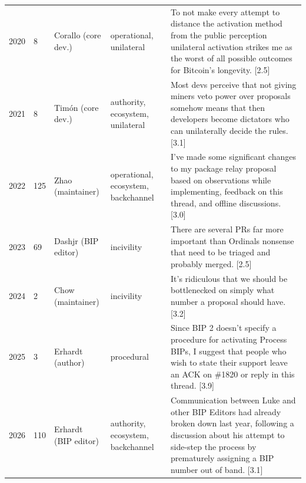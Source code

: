 \begin{table}[t]
\begin{tabular}{p{}p{}p{}p{}p{}}
2020 & 8 & Corallo (core dev.) & operational, unilateral & To not make every attempt to distance the activation method from the public perception unilateral activation strikes me as the worst of all possible outcomes for Bitcoin's longevity. [2.5] \\
2021 & 8 & Tim\'on (core dev.) & authority, ecosystem, unilateral & Most devs perceive that not giving miners veto power over proposals somehow means that then developers become dictators who can unilaterally decide the rules. [3.1] \\
2022 & 125 & Zhao (maintainer) & operational, ecosystem, backchannel & I've made some significant changes to my package relay proposal based on observations while implementing, feedback on this thread, and offline discussions. [3.0] \\
2023 & 69 & Dashjr (BIP editor) & incivility & There are several PRs far more important than Ordinals nonsense that need to be triaged and probably merged. [2.5] \\
2024 & 2 & Chow (maintainer) & incivility & It's ridiculous that we should be bottlenecked on simply what number a proposal should have. [3.2] \\
2025 & 3 & Erhardt (author) & procedural & Since BIP 2 doesn't specify a procedure for activating Process BIPs, I suggest that people who wish to state their support leave an ACK on \#1820 or reply in this thread. [3.9] \\
2026 & 110 & Erhardt (BIP editor) & authority, ecosystem, backchannel & Communication between Luke and other BIP Editors had already broken down last year, following a discussion about his attempt to side-step the process by prematurely assigning a BIP number out of band. [3.1] \\
\bottomrule
\end{tabular}
\end{table}

